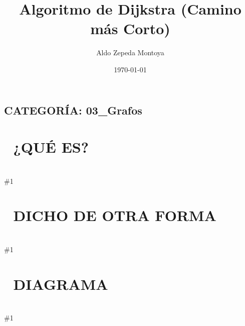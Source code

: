 \documentclass{article}
\newcommand{\quees}[1]{
    \section*{🤔 ¿QUÉ ES?}
    \hrulefill \\
    \#1
}
\newcommand{\dichodeotraforma}[1]{
    \section*{💬 DICHO DE OTRA FORMA}
    \hrulefill \\
    \#1
}
\newcommand{\diagrama}[1]{
    \section*{🎨 DIAGRAMA}
    \hrulefill \\
    \#1
}
\begin{document}
\title{Algoritmo de Dijkstra (Camino más Corto)}
\author{Aldo Zepeda Montoya}
\date{\today}
\maketitle

\subsection*{CATEGORÍA: 03\_Grafos}

\quees{
El GPS de tu teléfono 📱. Cuando pides la ruta más rápida de tu 
casa al trabajo, el GPS no intenta probar absolutamente todos los
caminos posibles al azar.

En su lugar, siempre expande primero el camino que parece más 
prometedor (el más corto que ha encontrado hasta ahora). Va 
construyendo la ruta óptima paso a paso, actualizando sus cálculos
si encuentra un "atajo" mejor.

Es un algoritmo "Greedy" (Codicioso) que encuentra el camino más corto
desde un nodo origen a todos los demás nodos en un grafo con pesos.
}

\dichodeotraforma{
Dijkstra resuelve el problema del "Single-Source Shortest Path" en
un grafo ponderado (weighted graph). 

Funciona manteniendo una lista de distancias tentativas y usando un
Min-Heap (Priority Queue) para elegir siempre el nodo con la distancia
mínima actual. 

⚠️ Restricción Vital: NO funciona si el grafo tiene aristas con 
PESOS NEGATIVOS. (Para eso se usa Bellman-Ford).
}

\diagrama{\begin{verbatim}
Grafo Ponderado:
       [2]
  (A)-------(B)
   | \       |
(4)|  \(1)   |(3)
   |   \     |
  (C)-------(D)
       (5)

Distancias desde A:
1. Inicio: {A:0, B:∞, C:∞, D:∞}
2. Visitar A: Vecinos B(2), C(4), D(1). 
   Heap elige D(1).
3. Visitar D: Vecinos B(1+3=4), C(1+5=6). 
   ¿4 < dist[B]? No. ¿6 < dist[C]? No.
4. Heap elige B(2).
5. Heap elige C(4).

Final: {A:0, B:2, C:4, D:1}
\end{verbatim}}
\end{document}
